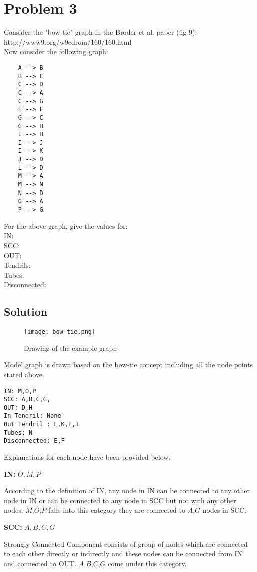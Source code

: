 

\section{Problem 3}
\label{part3}
Consider the "bow-tie" graph in the Broder et al. paper (fig 9):
http://www9.org/w9cdrom/160/160.html\\


\noindent Now consider the following graph:
    \begin{verbatim}
    A --> B
    B --> C
    C --> D
    C --> A
    C --> G
    E --> F
    G --> C
    G --> H
    I --> H
    I --> J
    I --> K
    J --> D
    L --> D
    M --> A
    M --> N
    N --> D
    O --> A
    P --> G
     \end{verbatim}
    For the above graph, give the values for:\\
IN: \\
SCC: \\
OUT: \\
Tendrils: \\
Tubes: \\
Disconnected:

\subsection{Solution}

\begin{figure}
\texttt{[image: bow-tie.png]}
\caption{Drawing of the example graph}
\label{fig:X-distribution}
\end{figure}


Model graph is drawn based on the bow-tie concept including all the node points stated above.

\begin{verbatim}
IN: M,O,P
SCC: A,B,C,G,
OUT: D,H
In Tendril: None
Out Tendril : L,K,I,J
Tubes: N
Disconnected: E,F
\end{verbatim}


Explanations for each node have been provided below.

\textbf{IN:}  $O, M, P$

According to the definition of IN, any node in IN can be connected to any other node in IN or can be connected to any node in SCC but not with any other nodes. $M$,$O$,$P$ falls into this category they are connected to $A$,$G$ nodes in SCC.

\textbf{SCC:}  $A, B, C, G$

Strongly Connected Component consists of group of nodes which are connected to each other directly or indirectly and these nodes can be connected from IN and connected to OUT. $A$,$B$,$C$,$G$ come under this category.

